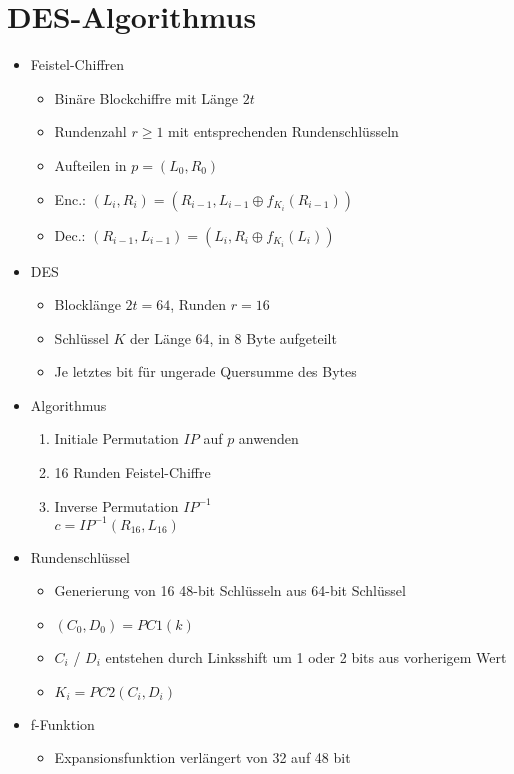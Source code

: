 \documentclass[11pt, paper=a4, twocolumn]{scrartcl}
\begin{document}
	\section{DES-Algorithmus}
		\begin{itemize}
			\item Feistel-Chiffren
				\begin{itemize}
					\item Binäre Blockchiffre mit Länge $2t$
					\item Rundenzahl $r\geq 1$ mit entsprechenden Rundenschlüsseln
					\item Aufteilen in $p=(L_0,R_0)$
					\item Enc.: $(L_i,R_i)=(R_{i-1},L_{i-1}\oplus f_{K_i}(R_{i-1}))$
					\item Dec.: $(R_{i-1},L_{i-1})=(L_i,R_i\oplus f_{K_i}(L_i))$
				\end{itemize}
			\item DES
				\begin{itemize}
					\item Blocklänge $2t=64$, Runden $r=16$
					\item Schlüssel $K$ der Länge 64, in 8 Byte aufgeteilt
					\item Je letztes bit für ungerade Quersumme des Bytes
				\end{itemize}
			\item Algorithmus
				\begin{enumerate}
					\item Initiale Permutation $IP$ auf $p$ anwenden
					\item 16 Runden Feistel-Chiffre
					\item Inverse Permutation $IP^{-1}$\\
						$c=IP^{-1}(R_{16},L_{16})$
				\end{enumerate}
			\item Rundenschlüssel
				\begin{itemize}
					\item Generierung von 16 48-bit Schlüsseln aus 64-bit Schlüssel
					\item $(C_0,D_0)=PC1(k)$
					\item $C_i$ / $D_i$ entstehen durch Linksshift um 1 oder 2 bits aus vorherigem Wert
					\item $K_i=PC2(C_i,D_i)$
				\end{itemize}
			\item f-Funktion
				\begin{itemize}
					\item Expansionsfunktion verlängert von 32 auf 48 bit 

\end{itemize}
\end{itemize}
\end{document}
